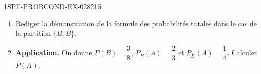 \begin{exercice}{1SPE-PROBCOND-EX-028}{2}{15}
\begin{enumerate}
  \item Rediger la démonstration de la formule des probabilités totales dans le cas de la partition $\{B, \overline{B}\}$.

  \item \textbf{Application.} On donne $P(B) = \dfrac{3}{8}$, $P_B(A) = \dfrac{2}{3}$ et $P_{\overline{B}}(A) = \dfrac{1}{4}$. Calculer $P(A)$.
\end{enumerate}
\end{exercice}
